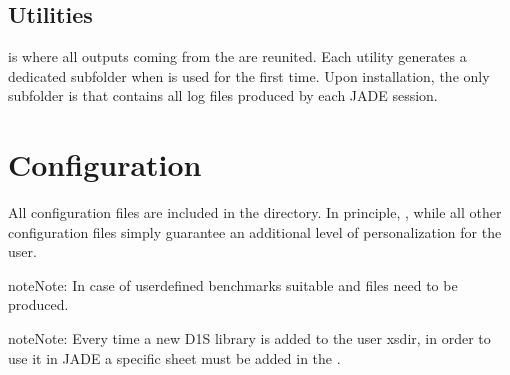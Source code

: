 \documentclass[letterpaper,10pt,english]{sphinxmanual}
\begin{document}
\section{Utilities}
\label{\detokenize{usage/folders:utilities}}
\sphinxAtStartPar
{} is where all outputs coming from the {\hyperref[\detokenize{usage/utilities:uty}]{}} are reunited. Each utility generates
a dedicated sub\sphinxhyphen{}folder when is used for the first time. Upon installation, the only sub\sphinxhyphen{}folder is
 that contains all log files produced by each JADE session.


\chapter{Configuration}
\label{\detokenize{usage/configuration:configuration}}\label{\detokenize{usage/configuration:config}}\label{\detokenize{usage/configuration::doc}}
\sphinxAtStartPar
All configuration files are included in the  directory.
In principle,  {\hyperref[\detokenize{usage/configuration:mainconfig}]{}} , while
all other configuration files simply guarantee an additional level of personalization for the user.

\begin{sphinxadmonition}{note}{Note:}
\sphinxAtStartPar
In case of user\sphinxhyphen{}defined benchmarks suitable {\hyperref[\detokenize{usage/configuration:runconf}]{}} and {\hyperref[\detokenize{usage/configuration:ppconf}]{}} files need
to be produced.
\end{sphinxadmonition}

\begin{sphinxadmonition}{note}{Note:}
\sphinxAtStartPar
Every time a new D1S library is added to the user xsdir, in order to use it in JADE a specific
sheet must be added in the {\hyperref[\detokenize{usage/configuration:activationfile}]{}}.
\end{sphinxadmonition}
\end{document}

